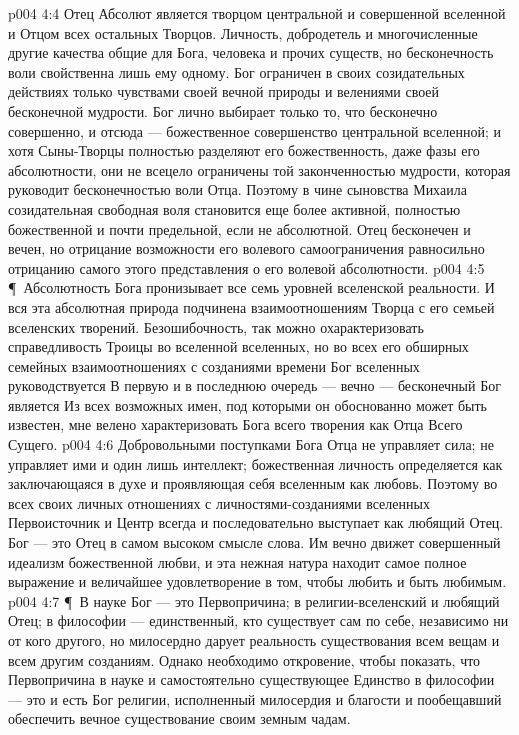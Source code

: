 \vs p004 4:4 Отец Абсолют является творцом центральной и совершенной вселенной и Отцом всех остальных Творцов. Личность, добродетель и многочисленные другие качества общие для Бога, человека и прочих существ, но бесконечность воли свойственна лишь ему одному. Бог ограничен в своих созидательных действиях только чувствами своей вечной природы и велениями своей бесконечной мудрости. Бог лично выбирает только то, что бесконечно совершенно, и отсюда --- божественное совершенство центральной вселенной; и хотя Сыны\hyp{}Творцы полностью разделяют его божественность, даже фазы его абсолютности, они не всецело ограничены той законченностью мудрости, которая руководит бесконечностью воли Отца. Поэтому в чине сыновства Михаила созидательная свободная воля становится еще более активной, полностью божественной и почти предельной, если не абсолютной. Отец бесконечен и вечен, но отрицание возможности его волевого самоограничения равносильно отрицанию самого этого представления о его волевой абсолютности.
\vs p004 4:5 \P\ Абсолютность Бога пронизывает все семь уровней вселенской реальности. И вся эта абсолютная природа подчинена взаимоотношениям Творца с его семьей вселенских творений. Безошибочность, так можно охарактеризовать справедливость Троицы во вселенной вселенных, но во всех его обширных семейных взаимоотношениях с созданиями времени Бог вселенных руководствуется  В первую и в последнюю очередь --- вечно --- бесконечный Бог является  Из всех возможных имен, под которыми он обоснованно может быть известен, мне велено характеризовать Бога всего творения как Отца Всего Сущего.
\vs p004 4:6 Добровольными поступками Бога Отца не управляет сила; не управляет ими и один лишь интеллект; божественная личность определяется как заключающаяся в духе и проявляющая себя вселенным как любовь. Поэтому во всех своих личных отношениях с личностями\hyp{}созданиями вселенных Первоисточник и Центр всегда и последовательно выступает как любящий Отец. Бог --- это Отец в самом высоком смысле слова. Им вечно движет совершенный идеализм божественной любви, и эта нежная натура находит самое полное выражение и величайшее удовлетворение в том, чтобы любить и быть любимым.
\vs p004 4:7 \P\ В науке Бог --- это Первопричина; в религии\hyp{}вселенский и любящий Отец; в философии --- единственный, кто существует сам по себе, независимо ни от кого другого, но милосердно дарует реальность существования всем вещам и всем другим созданиям. Однако необходимо откровение, чтобы показать, что Первопричина в науке и самостоятельно существующее Единство в философии --- это и есть Бог религии, исполненный милосердия и благости и пообещавший обеспечить вечное существование своим земным чадам.
